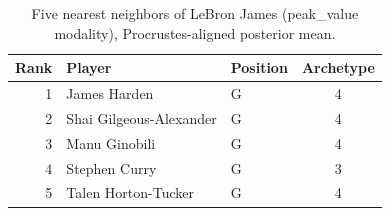 \begin{table}[htbp]
  \centering\small
  \begin{tabular}{rllc}
    \toprule
    Rank & Player & Position & Archetype \\
    \midrule
    1 & James Harden & G & 4 \\
    2 & Shai Gilgeous-Alexander & G & 4 \\
    3 & Manu Ginobili & G & 4 \\
    4 & Stephen Curry & G & 3 \\
    5 & Talen Horton-Tucker & G & 4 \\
    \bottomrule
  \end{tabular}
  \caption{Five nearest neighbors of LeBron James (peak_value modality), Procrustes-aligned posterior mean.}
  \label{tab:LeBron_James_neighbors_peak_value}
\end{table}

